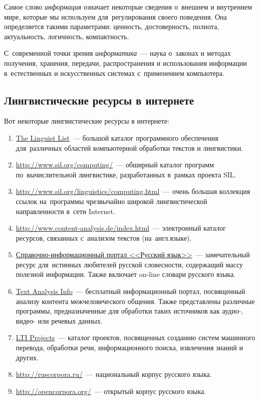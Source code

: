 \documentclass[12pt]{article}
\theoremstyle{definition}
\theoremstyle{remark}
\numberwithin{equation}{section}
\begin{document}
Самое слово {\sl информация} означает некоторые сведения о~внешнем и
внутреннем мире, которые мы используем для~регулирования своего
поведения. Она определяется такими параметрами: ценность, достоверность,
полнота, актуальность, логичность, компактность.

С~современной точки зрения {\sl информатика}~--- наука о~законах и
методах получения, хранения, передачи, распространения и использования
информации в~естественных и искусственных системах с~применением
компьютера.

\subsection{Лингвистические ресурсы в интернете}
Вот некоторые лингвистические ресурсы в интернете:
\begin{enumerate}[label=\*]
    \item \href{http://linguistlist.org/}{The Linguist List}~--- большой
    каталог программного обеспечения для~различных областей компьютерной
    обработки текстов и лингвистики.
    \item \url{http://www.sil.org/computing/}~--- обширный каталог
    программ по~вычислительной лингвистике, разработанных в~рамках
    проекта SIL.
    \item \url{http://www.sil.org/linguistics/computing.html}~--- очень
    большая коллекция ссылок на~программы чрезвычайно широкой лингвистической
    направленности в~сети Internet.
    \item \url{http://www.content-analysis.de/index.html}~--- электронный
    каталог ресурсов, связанных с~анализом текстов (на~англ.языке).
    \item \href{http://www.gramota.ru/index.html}{Справочно-информационный
    портал <<Русский язык>>}~--- замечательный ресурс для~истинных
    любителей русской словесности, содержащий массу полезной информации.
    Также включает on-line словари русского языка.
    \item \href{http://www.textanalysis.info/}{Text Analysis Info}~---
    бесплатный информационный портал, посвященный анализу контента
    межчеловеческого общения. Также представлены различные программы,
    предназначенные для обработки таких источников как аудио-, видео- или
    речевых данных.
    \item \href{http://www.lti.cs.cmu.edu/research/projects}{LTI Projects}~---
    каталог проектов, посвященных созданию систем машинного перевода,
    обработки речи, информационного поиска, извлечения знаний и других.
    \item \url{http://ruscorpora.ru/}~--- национальный корпус русского языка.
    \item \url{http://opencorpora.org/}~--- открытый корпус русского языка.
\end{enumerate}
\end{document}
